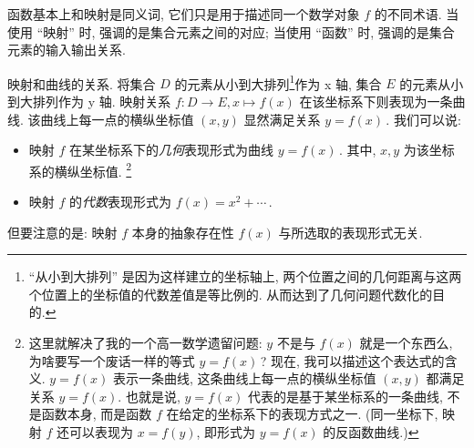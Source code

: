 \documentclass{book}
\numberwithin{equation}{section}
\numberwithin{figure}{section}
\theoremstyle{definition}
\newcommand{\dq}[1]{``#1''}
\begin{document}
函数基本上和映射是同义词, 它们只是用于描述同一个数学对象 $f$ 的不同术语. 当使用 \dq{映射} 时, 强调的是集合元素之间的对应; 当使用 \dq{函数} 时, 强调的是集合元素的输入输出关系.

映射和曲线的关系.
将集合 $D$ 的元素从小到大排列\footnote{\dq{从小到大排列} 是因为这样建立的坐标轴上, 两个位置之间的几何距离与这两个位置上的坐标值的代数差值是等比例的. 从而达到了几何问题代数化的目的.}作为 x 轴, 集合 $E$ 的元素从小到大排列作为 y 轴. 映射关系 $f:D\to E,x\mapsto f(x)$ 在该坐标系下则表现为一条曲线. 该曲线上每一点的横纵坐标值 $(x,y)$ 显然满足关系 $y=f(x)$\,.
我们可以说:
\begin{itemize}
  \item 映射 $f$ 在某坐标系下的\emph{几何}表现形式为曲线 $y=f(x)$\,. 其中, $x,y$ 为该坐标系的横纵坐标值. \footnote{这里就解决了我的一个高一数学遗留问题: $y$ 不是与 $f(x)$ 就是一个东西么, 为啥要写一个废话一样的等式 $y=f(x)$\,? 现在, 我可以描述这个表达式的含义. $y=f(x)$ 表示一条曲线, 这条曲线上每一点的横纵坐标值 $(x,y)$ 都满足关系 $y=f(x)$. 也就是说, $y=f(x)$ 代表的是基于某坐标系的一条曲线, 不是函数本身, 而是函数 $f$ 在给定的坐标系下的表现方式之一. (同一坐标下, 映射 $f$ 还可以表现为 $x=f(y)$, 即形式为 $y=f(x)$ 的反函数曲线.)}
  \item 映射 $f$ 的\emph{代数}表现形式为 $f(x)=x^2+\cdots$\,.
\end{itemize}
但要注意的是: 映射 $f$ 本身的抽象存在性 $f(x)$ 与所选取的表现形式无关.
\end{document}
